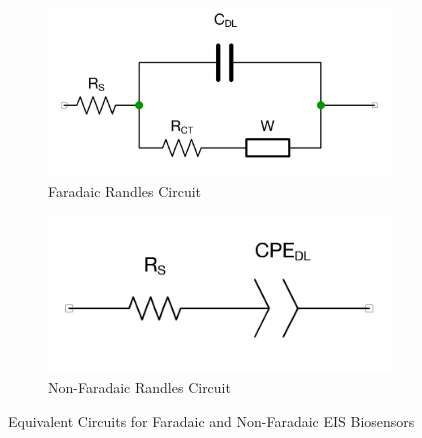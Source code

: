 \begin{figure}[ht]
    \centering
    \begin{subfigure}{0.45\textwidth}
        \centering
        \includegraphics[width=\textwidth]{RandlesFaradaic.png}
        \caption{Faradaic Randles Circuit}
        \label{fig:randles_fardaic}
    \end{subfigure}
    \hfill
    \begin{subfigure}{0.45\textwidth}
        \centering
        \includegraphics[width=\textwidth]{RandlesNonFaradaic.png}
        \caption{Non-Faradaic Randles Circuit}
        \label{fig:randles_non_faradaic}    
    \end{subfigure}
    \caption{Equivalent Circuits for Faradaic and Non-Faradaic EIS Biosensors}
    \label{fig:randles_circuits}
\end{figure}





